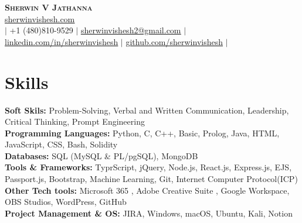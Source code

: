 \documentclass[letterpaper,11pt]{article}
\begin{document}

\begin{center}
    \textbf{\Huge \scshape Sherwin V Jathanna} \\ \vspace{1pt}
     \href{https://sherwinvishesh.com}{\underline{sherwinvishesh.com}} 
   \\ \small $|$ +1 (480)810-9529 $|$ \href{mailto:sherwinvishesh2@gmail.com}{\underline{sherwinvishesh2@gmail.com}} $|$ 
    \href{https://linkedin.com/in/sherwinvishesh}{\underline{linkedin.com/in/sherwinvishesh}} $|$
    \href{https://github.com/sherwinvishesh}{\underline{github.com/sherwinvishesh}} $|$
     \\ 
\end{center}


\section{Skills}
 \begin{itemize}[leftmargin=0.15in, label={}]
    \small{\item{
    \textbf{Soft Skils:}{ Problem-Solving, Verbal and Written Communication, Leadership, Critical Thinking, Prompt Engineering} \\
     \textbf{Programming Languages:}{ Python, C, C++, Basic, Prolog, Java, HTML, JavaScript, CSS,  Bash, Solidity} \\
     \textbf{Databases:}{ SQL (MySQL \& PL/pgSQL), MongoDB} \\
     \textbf{Tools \& Frameworks:}{ TyprScript, jQuery, Node.js, React.js, Express.js, EJS, Passport.js, Bootstrap, Machine Learning, Git,  Internet Computer Protocol(ICP) } \\
     \textbf{Other Tech tools:}{ Microsoft 365 , Adobe Creative Suite
, Google Workspace, OBS Studios, WordPress, GitHub } \\
     \textbf{Project Management \& OS: }{ JIRA, Windows, macOS, Ubuntu, Kali, Notion}
    }}
 \end{itemize}
\end{document}
